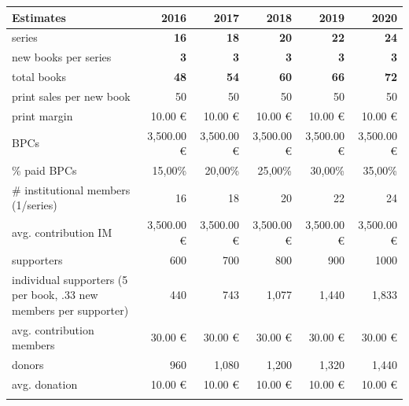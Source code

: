 \documentclass[nonflat,smallfont
]{langsci/langscibook}
\begin{document}
{{\scriptsize
\noindent
\begin{tabularx}{\textwidth}{Qrrrrr}
\lsptoprule
{ \textbf{Estimates}} & \textbf{2016} & \textbf{2017} & \textbf{2018} & \textbf{2019} & \textbf{2020}\\
\midrule 
series &  \textbf{16} &  \textbf{18} &  \textbf{20} &  \textbf{22} &  \textbf{24}\\
new books per series&  \textbf{3} &  \textbf{3} &  \textbf{3} &  \textbf{3} &  \textbf{3}\\
total books &  \textbf{48} &  \textbf{54} &  \textbf{60} &  \textbf{66} &  \textbf{72}\\
print sales per new book&  50 &  50 &  50 &  50 &  50\\
print margin&  10.00 € &  10.00 € &  10.00 € &  10.00 € &  10.00 €\\
BPCs&  3,500.00 € &  3,500.00 € &  3,500.00 € &  3,500.00 € &  3,500.00 €\\
\% paid BPCs&  15,00\% &  20,00\% &  25,00\% &  30,00\% &  35,00\%\\
\# institutional members (1/series) &  16 &  18 &  20 &  22 &  24\\
avg. contribution IM&  3,500.00 € &  3,500.00 € &  3,500.00 € &  3,500.00 € &  3,500.00 €\\
supporters &  600 &  700 &  800 &  900 &  1000\\
individual supporters (5 per book, .33 new members per supporter) &  440 &  743 &  1,077 &  1,440 &  1,833\\
avg. contribution members &  30.00 € &  30.00 € &  30.00 € &  30.00 € &  30.00 €\\
donors &  960 &  1,080 &  1,200 &  1,320 &  1,440\\
avg. donation&  10.00 € &  10.00 € &  10.00 € &  10.00 € &  10.00 €\\
\lspbottomrule
\end{tabularx}
}

\bigskip 
\noindent
{}}
\end{document}
